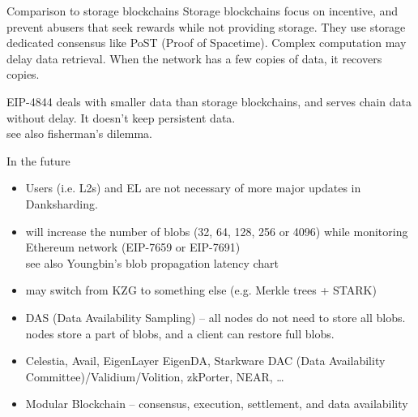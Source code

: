 \documentclass[10pt]{beamer}
\begin{document}
\begin{frame}[fragile]{Comparison to storage blockchains}
Storage blockchains focus on incentive, and prevent abusers
  that seek rewards while not providing storage. They use
  storage dedicated consensus like PoST (Proof of Spacetime).
  Complex computation may delay data retrieval. When the network
  has a few copies of data, it recovers copies.

EIP-4844 deals with smaller data than storage blockchains,
  and serves chain data without delay. It doesn't keep
  persistent data. \\ see also fisherman's dilemma.
\end{frame}

\begin{frame}[fragile]{In the future}
\begin{itemize}
  \item Users (i.e. L2s) and EL are not necessary of more major updates in
    \mbox{Danksharding}.
  \item will increase the number of blobs (32, 64, 128, 256 or 4096)
    while monitoring Ethereum network (EIP-7659 or EIP-7691) \\
    see also Youngbin's blob propagation latency chart
  \item may switch from KZG to something else (e.g. Merkle trees + STARK)
  \item DAS (Data Availability Sampling) -- all nodes do not need to store
    all blobs. nodes store a part of blobs, and a client can restore full blobs.
  \item Celestia, Avail, EigenLayer EigenDA, Starkware DAC
    (Data Availability Committee)/Validium/Volition, zkPorter, NEAR, \ldots
  \item Modular Blockchain -- consensus, execution, settlement,
    and data availability
\end{itemize}
\end{frame}
\end{document}

